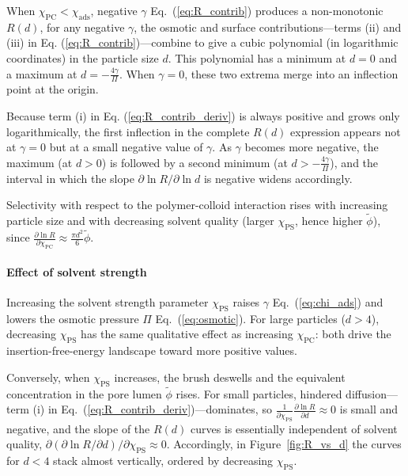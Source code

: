 \documentclass[12pt, a4paper]{article}
\begin{document}
When $\chi_{\text{PC}}<\chi_{\text{ads}}$, negative $\gamma$ Eq.~(\ref{eq:R_contrib}) produces a non-monotonic $R(d)$, 
for any negative $\gamma$, the osmotic and surface contributions—terms (ii) and (iii) in Eq. (\ref{eq:R_contrib})—combine to give a cubic polynomial (in logarithmic coordinates) in the particle size $d$. This polynomial has a minimum at $d=0$ and a maximum at $d=-\tfrac{4\gamma}{\Pi}$. 
When $\gamma = 0$, these two extrema merge into an inflection point at the origin.

Because term (i) in Eq. (\ref{eq:R_contrib_deriv}) is always positive and grows only logarithmically, the first inflection in the complete $R(d)$ expression appears not at $\gamma = 0$ but at a small negative value of $\gamma$. As $\gamma$ becomes more negative, the maximum (at $d>0$) is followed by a second minimum (at $d>-\tfrac{4\gamma}{\Pi}$), and the interval in which the slope $\partial\ln R/\partial\ln d$ is negative widens accordingly.

Selectivity with respect to the polymer-colloid interaction rises with increasing particle size and with decreasing solvent quality (larger $\chi_{\text{PS}}$, hence higher $\tilde{\phi}$), since
$\frac{\partial \ln R}{\partial \chi_{\text{PC}}} \approx  \frac{\pi d^{2}}{6}\tilde{\phi}$.



\paragraph{Effect of solvent strength}
Increasing the solvent strength parameter $\chi_{\text{PS}}$ raises $\gamma$ Eq.~(\ref{eq:chi_ads}) and lowers the osmotic pressure $\Pi$ Eq.~(\ref{eq:osmotic}).  
For large particles ($d>4$), decreasing $\chi_{\text{PS}}$ has the same qualitative effect as increasing $\chi_{\text{PC}}$: both drive the insertion-free-energy landscape toward more positive values.

Conversely, when $\chi_{\text{PS}}$ increases, the brush deswells and the equivalent concentration in the pore lumen $\tilde{\phi}$ rises.  
For small particles, hindered diffusion—term (i) in Eq.~(\ref{eq:R_contrib_deriv})—dominates, so  
$\tfrac{1}{\partial \chi_{\text{PS}}}\tfrac{\partial \ln R}{\partial d} \approx 0$ is small and negative, and the slope of the $R(d)$ curves is essentially independent of solvent quality,  
$\partial(\partial\ln R/\partial d)/\partial\chi_{\text{PS}}\approx0$.  
Accordingly, in Figure~\ref{fig:R_vs_d} the curves for $d<4$ stack almost vertically, ordered by decreasing $\chi_{\text{PS}}$.
\end{document}
